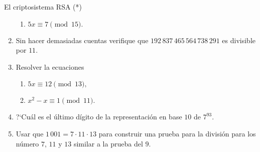 \begin{section}{El criptosistema RSA (*)}
\begin{enumerate}
\begin{enumerate}
	\item  $5x\equiv 7 \pmod{15}.$
\end{enumerate}
\item Sin hacer demasiadas cuentas verifique que
$192\,837\,465\,564\,738\,291$ es divisible por $11$.
\item Resolver la ecuaciones
\begin{enumerate}
\item $5x\equiv12 \pmod{13},$

\item $x^2-x \equiv 1 \pmod{11}.$
\end{enumerate}
%
\item ?`Cuál es el último dígito de la representación en base $10$ de
$7^{93}$.
\item Usar que $1\,001=7\cdot 11 \cdot 13$ para construir una prueba
para la división para los número $7$, $11$ y $13$ similar a la prueba
del $9$.
\end{enumerate}
\end{section}



